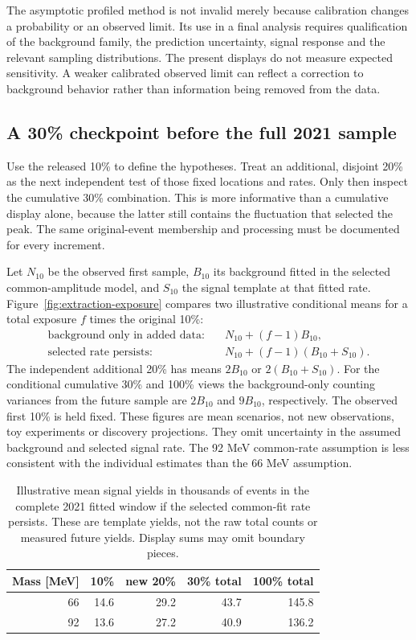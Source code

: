 The asymptotic profiled method is not invalid merely because calibration changes a probability or an observed limit. Its use in a final analysis requires qualification of the background family, the prediction uncertainty, signal response and the relevant sampling distributions. The present displays do not measure expected sensitivity. A weaker calibrated observed limit can reflect a correction to background behavior rather than information being removed from the data.

\clearpage
\subsection*{A 30\% checkpoint before the full 2021 sample}
Use the released 10\% to define the hypotheses. Treat an additional, disjoint 20\% as the next independent test of those fixed locations and rates. Only then inspect the cumulative 30\% combination. This is more informative than a cumulative display alone, because the latter still contains the fluctuation that selected the peak. The same original-event membership and processing must be documented for every increment.

Let $N_{10}$ be the observed first sample, $B_{10}$ its background fitted in the selected common-amplitude model, and $S_{10}$ the signal template at that fitted rate. Figure~\ref{fig:extraction-exposure} compares two illustrative conditional means for a total exposure $f$ times the original 10\%:
\[
\begin{aligned}
\text{background only in added data:}&\quad N_{10}+(f-1)B_{10},\\
\text{selected rate persists:}&\quad N_{10}+(f-1)(B_{10}+S_{10}).
\end{aligned}
\]
The independent additional 20\% has means $2B_{10}$ or $2(B_{10}+S_{10})$. For the conditional cumulative 30\% and 100\% views the background-only counting variances from the future sample are $2B_{10}$ and $9B_{10}$, respectively. The observed first 10\% is held fixed. These figures are mean scenarios, not new observations, toy experiments or discovery projections. They omit uncertainty in the assumed background and selected signal rate. The 92 MeV common-rate assumption is less consistent with the individual estimates than the 66 MeV assumption.

\begin{table}[H]\centering\small
\begin{tabular}{rrrrr}\toprule
Mass [MeV] & 10\% & new 20\% & 30\% total & 100\% total\\\midrule
66 & 14.6 & 29.2 & 43.7 & 145.8\\
92 & 13.6 & 27.2 & 40.9 & 136.2\\
\bottomrule\end{tabular}
\caption{Illustrative mean signal yields in thousands of events in the complete 2021 fitted window if the selected common-fit rate persists. These are template yields, not the raw total counts or measured future yields. Display sums may omit boundary pieces.}\end{table}

